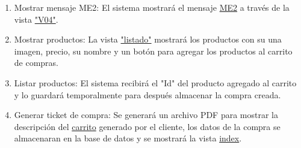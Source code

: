 \begin{enumerate}
		\item Mostrar mensaje ME2: El sistema mostrar\'a el mensaje \hyperlink{ME2}{ME2} a trav\'es de la vista \hyperlink{V04}{"V04"}. \\
		
		\item Mostrar productos: La vista \hyperlink{listado}{"listado"} mostrar\'a los productos con su una imagen, precio, su nombre y un bot\'on para agregar los productos al carrito de compras. \\
		
		\item Listar productos: El sistema recibir\'a el "Id" del producto agregado al carrito y lo guardar\'a temporalmente para despu\'es almacenar la compra creada. \\
		
		\item Generar ticket de compra: Se generar\'a un archivo PDF para mostrar la descripci\'on del \hyperlink{carrito}{carrito} generado por el cliente, los datos de la compra se almacenaran en la base de datos y se mostrar\'a la vista \hyperlink{index}{index}. \\
	\end{enumerate}